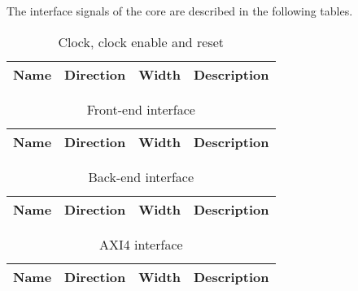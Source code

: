 The interface signals of the core are described in the following tables.

\begin{table}[H]
  \centering
  \begin{tabularx}{\textwidth}{|l|l|r|X|}

    \hline
    \rowcolor{iob-green}
    {\bf Name} & {\bf Direction} & {\bf Width} & {\bf Description}  \\ \hline \hline

    

  \end{tabularx}
  \caption{Clock, clock enable and reset}
  \label{clk_en_rst_s_if_tab:is}
\end{table}

\begin{table}[H]
  \centering
  \begin{tabularx}{\textwidth}{|l|l|r|X|}

    \hline
    \rowcolor{iob-green}
    {\bf Name} & {\bf Direction} & {\bf Width} & {\bf Description}  \\ \hline \hline

    

  \end{tabularx}
  \caption{Front-end interface}
  \label{iob_s_if_tab:is}
\end{table}

\begin{table}[H]
  \centering
  \begin{tabularx}{\textwidth}{|l|l|r|X|}

    \hline
    \rowcolor{iob-green}
    {\bf Name} & {\bf Direction} & {\bf Width} & {\bf Description}  \\ \hline \hline

    

  \end{tabularx}
  \caption{Back-end interface}
  \label{iob_m_if_tab:is}
\end{table}

\begin{table}[H]
  \centering
  \begin{tabularx}{\textwidth}{|l|l|r|X|}

    \hline
    \rowcolor{iob-green}
    {\bf Name} & {\bf Direction} & {\bf Width} & {\bf Description}  \\ \hline \hline

    

  \end{tabularx}
  \caption{AXI4 interface}
  \label{axi_m_if_tab:is}
\end{table}

